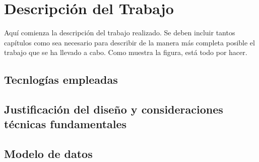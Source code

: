 \chapter{Descripción del Trabajo}
\label{cap:descripcionTrabajo}

Aquí comienza la descripción del trabajo realizado. Se deben incluir tantos capítulos como sea necesario para describir de la manera más completa posible el trabajo que se ha llevado a cabo. Como muestra la figura, está todo por hacer.

\section{Tecnlogías empleadas}
\section{Justificación del diseño y consideraciones técnicas fundamentales}
\section{Modelo de datos}